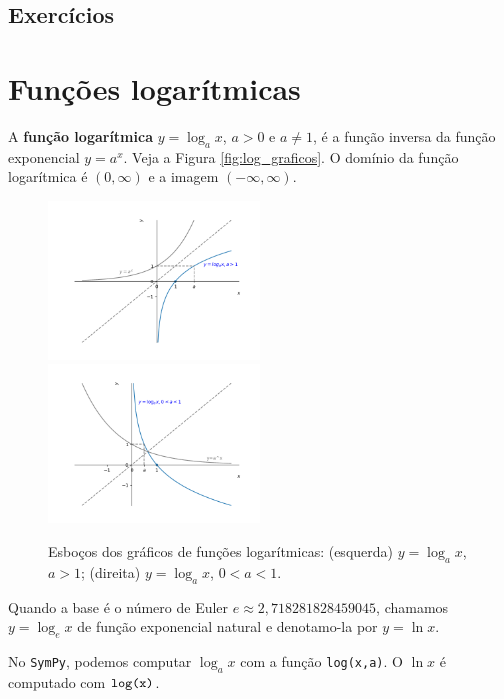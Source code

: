 \subsection*{Exercícios}

\emconstrucao

\section{Funções logarítmicas}\label{cap_funcao_sec_funlog}

A {\bf função logarítmica} $y = \log_a x$, $a>0$ e $a\neq 1$, é a função inversa da função exponencial $y = a^x$. Veja a Figura \ref{fig:log_graficos}. O domínio da função logarítmica é $(0,\infty)$ e a imagem $(-\infty, \infty)$.

\begin{figure}[H]
  \centering
  \includegraphics[width=0.5\textwidth]{./cap_funcao/dados/fig_log_graficos/fig_log_2}~
  \includegraphics[width=0.5\textwidth]{./cap_funcao/dados/fig_log_graficos/fig_log_12}
  \caption{Esboços dos gráficos de funções logarítmicas: (esquerda) $y = \log_a x$, $a>1$; (direita) $y = \log_a x$, $0<a<1$.}
  \label{fig:exponencial_graficos}
\end{figure}

\begin{obs}
  Quando a base é o número de Euler $e \approx 2,718281828459045$, chamamos $y = \log_e x$ de função exponencial natural e denotamo-la por $y = \ln x$.

  \ifispython
  No \verb+SymPy+, podemos computar $\log_a x$ com a função \verb+log(x,a)+. O $\ln x$ é computado com $\verb+log(x)+$.
  \fi
\end{obs}


